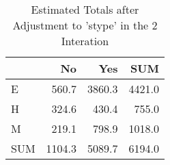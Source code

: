 \begin{table}[ht]
\centering
\caption{Estimated Totals after Adjustment to 'stype' in the 2 Interation} 
\begin{tabular}{l|rr|r}
  & No & Yes & SUM \\ 
  \hline
E & 560.7 & 3860.3 & 4421.0 \\ 
  H & 324.6 & 430.4 & 755.0 \\ 
  M & 219.1 & 798.9 & 1018.0 \\ 
   \hline
SUM & 1104.3 & 5089.7 & 6194.0 \\ 
  \end{tabular}
\end{table}
